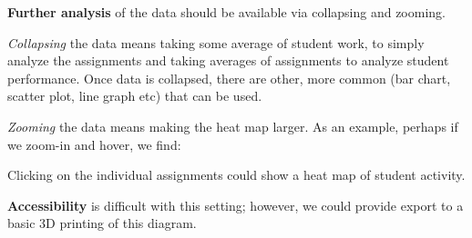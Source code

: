 \documentclass{techbrief}
\begin{document}
\begin{xframe}
    \textbf{Further analysis} of the data should be available via
    collapsing and zooming.

    \textit{Collapsing} the data means taking some average of student work, to
    simply
    analyze the assignments and taking averages of assignments to analyze
    student
    performance. Once data is collapsed, there are other, more common (bar
    chart,
    scatter plot, line graph etc) that can be used.

    \textit{Zooming} the data means making the heat map larger.
    As an example, perhaps if we zoom-in and hover, we find:
    \begin{center}
    \end{center}
    Clicking on the individual assignments could show a heat map of student
    activity.
\end{xframe}

\begin{xframe}
    \textbf{Accessibility} is difficult with this setting; however, we could
    provide export to a basic 3D printing of this diagram.
\end{xframe}
\end{document}
